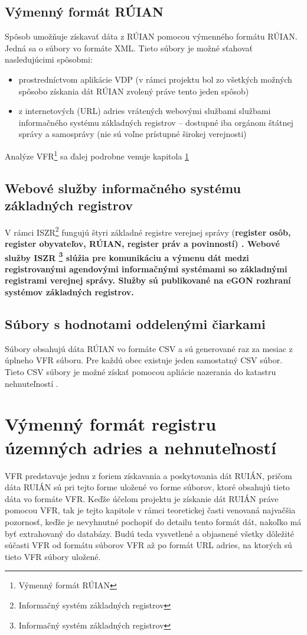 \subsection{Výmenný formát RÚIAN}
\label{vdpbegin}
Spôsob umožňuje získavať dáta z RÚIAN pomocou výmenného formátu RÚIAN.\cite{Vfr} Jedná sa o súbory vo formáte XML. Tieto súbory je možné sťahovať nasledujúcimi spôsobmi: 
\begin{itemize}
	\item{prostredníctvom aplikácie VDP (v rámci projektu bol zo všetkých možných spôsobo získania dát RÚIAN zvolený práve tento jeden spôsob)}
	\item{z internetových (URL) adries vrátených webovými službami službami informačného systému základných registrov \cite{Iszr} – dostupné iba orgánom
      štátnej správy a samosprávy (nie sú voľne prístupné širokej verejnosti)}
\end{itemize}
Analýze VFR\footnote{Výmenný formát RÚIAN} sa ďalej podrobne venuje kapitola \ref{VymennyFormat}
\subsection{Webové služby informačného systému základných registrov}
V rámci ISZR\footnote{Informačný systém základných registrov} fungujú štyri základné registre verejnej správy (\bf register osôb, register obyvateľov, RÚIAN, register práv a povinností\rm) \cite{Zr}.
Webové služby ISZR \footnote{Informačný systém základných registrov} slúžia pre komunikáciu a výmenu dát medzi registrovanými agendovými informačnými systémami\cite{Ais} so základnými registrami verejnej správy.
Služby sú publikované na eGON \cite{Egon} rozhraní systémov základných registrov.
\subsection{Súbory s hodnotami oddelenými čiarkami}
Súbory obsahujú dáta RÚIAN vo formáte CSV a sú generované raz za mesiac z úplneho VFR súboru. Pre každú obec existuje jeden samostatný CSV súbor\cite{Csv}. Tieto CSV súbory je možné získať pomocou apliácie nazerania do katastru nehnuteľností \cite{Kn}.

\section{Výmenný formát registru územných adries a nehnuteľností}
\label{VymennyFormat}
VFR predstavuje jednu z foriem získavania a poskytovania dát RUIÁN, pričom dáta RUIÁN sú pri tejto forme uložené vo forme súborov, ktoré obsahujú tieto dáta vo formáte VFR. Keďže účelom projektu je získanie dát RUIÁN práve pomocou VFR, tak je tejto kapitole v rámci teoretickej časti venovaná najvačšia pozornosť, keďže je nevyhnutné pochopiť do detailu tento formát dát, nakoľko má byť extrahovaný do databázy. Budú teda vysvetlené a objasnené všetky dôležité súčasti VFR od formátu súborov VFR až po formát URL \cite{Url} adries, na ktorých sú tieto VFR súbory uložené.
